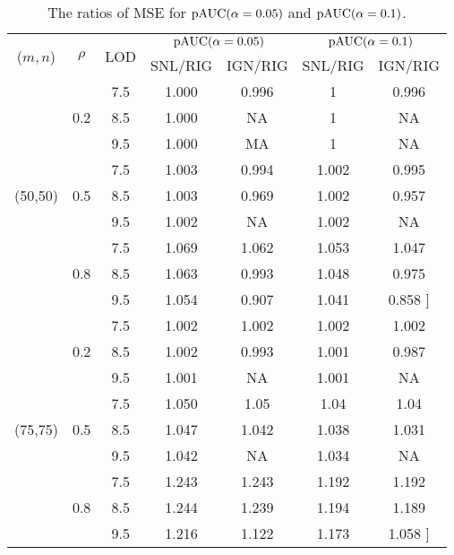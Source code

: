 \documentclass[a4,11pt,epsf, amssymb]{article}
\begin{document}
\begin{table}[htbp]
  \centering
  \caption{The ratios of MSE for $\hbox {pAUC}(\alpha = 0.05)$ and $\hbox {pAUC}(\alpha = 0.1)$.}
    \begin{tabular}{c|cccccc}
    \hline
    \multirow{2}[2]{*}{($m,n$)} & \multirow{2}[2]{*}{$\rho$} & \multirow{2}[2]{*}{LOD} & \multicolumn{2}{c}{$\hbox {pAUC}(\alpha = 0.05)$} & \multicolumn{2}{c}{$\hbox {pAUC}(\alpha = 0.1)$} \\
          &       &       & SNL/RIG & IGN/RIG & SNL/RIG & IGN/RIG \\
    \hline
    \multirow{9}[4]{*}{(50,50)} & \multirow{3}[2]{*}{0.2} & 7.5   & 1.000  & 0.996 & 1     & 0.996 \\
          &       & 8.5   & 1.000  & NA    & 1     & NA \\
          &       & 9.5   & 1.000  & MA    & 1     & NA \\
\cline{2-7}          & \multirow{3}[1]{*}{0.5} & 7.5   & 1.003  & 0.994 & 1.002 & 0.995\\
          &       & 8.5   & 1.003  & 0.969 & 1.002 & 0.957 \\
          &       & 9.5   & 1.002  & NA    & 1.002 & NA \\
          & \multirow{3}[1]{*}{0.8} & 7.5   & 1.069  & 1.062 & 1.053 & 1.047 \\
          &       & 8.5   & 1.063  & 0.993 & 1.048 & 0.975 \\
          &       & 9.5   & 1.054  & 0.907 & 1.041 & 0.858 ]\\
    \hline
    \multirow{9}[6]{*}{(75,75)} & \multirow{3}[2]{*}{0.2} & 7.5   & 1.002  & 1.002  & 1.002 & 1.002 \\
          &       & 8.5   & 1.002  & 0.993  & 1.001 & 0.987 \\
          &       & 9.5   & 1.001  & NA    & 1.001 & NA\\
\cline{2-7}          & \multirow{3}[2]{*}{0.5} & 7.5   & 1.050  & 1.05  & 1.04  & 1.04\\
          &       & 8.5   & 1.047  & 1.042 & 1.038 & 1.031 \\
          &       & 9.5   & 1.042  & NA    & 1.034 & NA \\
\cline{2-7}          & \multirow{3}[2]{*}{0.8} & 7.5   & 1.243  & 1.243 & 1.192 & 1.192 \\
          &       & 8.5   & 1.244  & 1.239 & 1.194 & 1.189 \\
          &       & 9.5   & 1.216  & 1.122 & 1.173 & 1.058 ]\\

\end{tabular}
\end{table}
\end{document}

